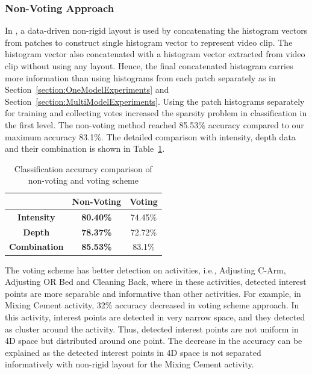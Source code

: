 \documentclass[a4paper, 10pt, conference]{ieeeconf}      %
\begin{document}
\subsubsection{Non-Voting Approach}
\label{section:NonVotingAproachExperiments}
    In \cite{c1}, a data-driven non-rigid layout is used by concatenating the histogram vectors from patches to construct single histogram vector to represent video clip. The histogram vector also concatenated with a histogram vector extracted from video clip without using any layout. Hence, the final concatenated histogram carries more information than using histograms from each patch separately as in Section~\ref{section:OneModelExperiments} and Section~\ref{section:MultiModelExperiments}. Using the patch histograms separately for training and collecting votes increased the sparsity problem in classification in the first level. The non-voting method reached 85.53\% accuracy compared to our maximum accuracy 83.1\%. The detailed comparison with intensity, depth data and their combination is shown in Table~\ref{table:comparisonResults}.
    
    
\begin{table}[H]
\centering
\begin{tabular}{|c|c|c|}
\hline
                  & {\bf Non-Voting \cite{c1}}   & {\bf Voting} \\ \hline
{\bf Intensity}   & {\bf 80.40\%} & 74.45\%    \\ \hline
{\bf Depth}       & {\bf 78.37\%} & 72.72\%    \\ \hline
{\bf Combination} & {\bf 85.53\%} & 83.1\%     \\ \hline
\end{tabular}
\caption{Classification accuracy comparison of non-voting \cite{c1} and voting scheme}
\label{table:comparisonResults}
\end{table}
           


The voting scheme has better detection on activities, i.e., Adjusting C-Arm, Adjusting OR Bed and Cleaning Back, where in these activities, detected interest points are more separable and informative than other activities. For example, in  Mixing Cement activity, 32\% accuracy decreased in voting scheme approach. In this activity, interest points are detected in very narrow space, and they detected as cluster around the activity. Thus, detected interest points are not uniform in 4D space but distributed around one point. The decrease in the accuracy can be explained as the detected interest points in 4D space is not separated informatively with non-rigid layout for the Mixing Cement activity.
\end{document}
